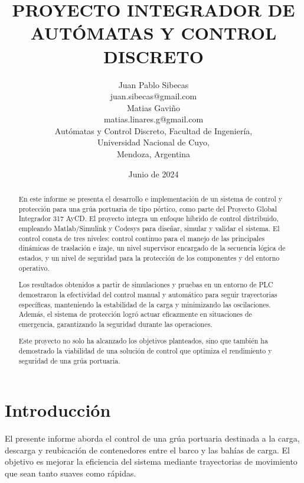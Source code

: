 \documentclass{article}
\title{PROYECTO INTEGRADOR DE AUTÓMATAS Y CONTROL DISCRETO}
\author{Juan Pablo Sibecas \\ juan.sibecas@gmail.com \\Matias Gaviño\\ matias.linares.g@gmail.com \\ Autómatas y Control Discreto, Facultad de Ingeniería, \\ Universidad Nacional de Cuyo, \\ Mendoza, Argentina}
\date{Junio de 2024}
\begin{document}
\renewcommand{\tablename}{Tabla}

\maketitle

\begin{abstract}\label{sec:abstract}

En este informe se presenta el desarrollo e implementación de un sistema de control y protección para una grúa portuaria de tipo pórtico, como parte del Proyecto Global Integrador 317 AyCD. El proyecto integra un enfoque híbrido de control distribuido, empleando Matlab/Simulink y Codesys para diseñar, simular y validar el sistema. El control consta de tres niveles: control continuo para el manejo de las principales dinámicas de traslación e izaje, un nivel supervisor encargado de la secuencia lógica de estados, y un nivel de seguridad para la protección de los componentes y del entorno operativo.

Los resultados obtenidos a partir de simulaciones y pruebas en un entorno de PLC demostraron la efectividad del control manual y automático para seguir trayectorias específicas, manteniendo la estabilidad de la carga y minimizando las oscilaciones. Además, el sistema de protección logró actuar eficazmente en situaciones de emergencia, garantizando la seguridad durante las operaciones.

Este proyecto no solo ha alcanzado los objetivos planteados, sino que también ha demostrado la viabilidad de una solución de control que optimiza el rendimiento y seguridad de una grúa portuaria.



\end{abstract}

\newpage

\tableofcontents

\newpage

\section{Introducción} \label{sec:intro}


El presente informe aborda el control de una grúa portuaria destinada a la carga, descarga y reubicación de contenedores entre el barco y las bahías de carga. El objetivo es mejorar la eficiencia del sistema mediante trayectorias de movimiento que sean tanto suaves como rápidas.
\end{document}
